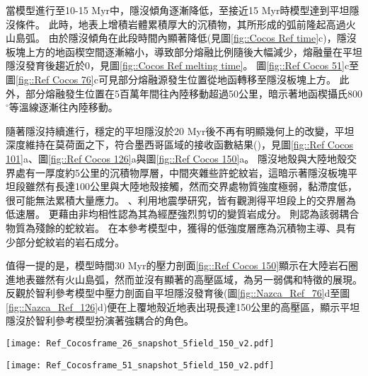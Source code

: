 當模型進行至10-15 Myr中，隱沒傾角逐漸降低，至接近15 Myr時模型達到平坦隱沒條件。
此時，地表上增積岩體累積厚大的沉積物，其所形成的弧前隆起高過火山島弧。
由於隱沒傾角在此段時間內顯著降低(見圖\ref{fig::Cocos Ref time}c)，隱沒板塊上方的地函楔空間逐漸縮小，導致部分熔融比例隨後大幅減少，熔融量在平坦隱沒發育後趨近於0，見圖\ref{fig::Cocos Ref melting time}。
圖\ref{fig::Ref Cocos 51}c至圖\ref{fig::Ref Cocos 76}c可見部分熔融源發生位置從地函轉移至隱沒板塊上方。
此外，部分熔融發生位置在5百萬年間往內陸移動超過50公里，暗示著地函楔攝氏800$^{\circ}$等溫線逐漸往內陸移動。

隨著隱沒持續進行，穩定的平坦隱沒於20 Myr後不再有明顯幾何上的改變，平坦深度維持在莫荷面之下，符合墨西哥區域的接收函數結果(\citealp{PerezCampos2008})，見圖\ref{fig::Ref Cocos 101}a、圖\ref{fig::Ref Cocos 126}a與圖\ref{fig::Ref Cocos 150}a。
隱沒地殼與大陸地殼交界處有一厚度約5公里的沉積物厚層，中間夾雜些許蛇紋岩，這暗示著隱沒板塊平坦段雖然有長達100公里與大陸地殼接觸，然而交界處物質強度極弱，黏滯度低，很可能無法累積大量應力。
\citealp{Song2009}、\citealp{Song2012SC}利用地震學研究，皆有觀測得平坦段上的交界層為低速層。
\citealp{Song2012SC}更藉由非均相性認為其為經歷強烈剪切的變質岩成分。
\citealp{Manea2017}則認為該弱耦合物質為殘餘的蛇紋岩。
在本參考模型中，獲得的低強度層應為沉積物主導、具有少部分蛇紋岩的岩石成分。

值得一提的是，模型時間30 Myr的壓力剖面\ref{fig::Ref Cocos 150}顯示在大陸岩石圈進地表雖然有火山島弧，然而並沒有顯著的高壓區域，為另一弱偶和特徵的展現。
反觀於智利參考模型中壓力剖面自平坦隱沒發育後(圖\ref{fig::Nazca_Ref_76}d至圖\ref{fig::Nazca_Ref_126}d)便在上覆地殼近地表出現長達150公里的高壓區，顯示平坦隱沒於智利參考模型扮演著強耦合的角色。

\begin{figure*}[htp]
    \centering
    \texttt{[image: Ref\_Cocosframe\_26\_snapshot\_5field\_150\_v2.pdf]}
    \caption[墨西哥參考模型於5 Myr時之結果]{墨西哥參考模型於5 Myr時之結果。(a)為岩相剖面，圖中實線為攝氏200-1200度等溫線，粉紅虛線為攝氏1330度等溫線。(b)為黏滯度剖面，(c)為密度剖面，黃點標示部分熔融位置，(d)為動水壓力剖面，(e)為應變率第二不變量。圖(b)-(e)中的灰色實線描繪攝氏400$^{\circ}$、600$^{\circ}$與800$^{\circ}$等溫線。}
    \label{fig::Ref Cocos 26}
\end{figure*}

\begin{figure*}[htp]
    \centering
    \texttt{[image: Ref\_Cocosframe\_51\_snapshot\_5field\_150\_v2.pdf]}
    \caption[墨西哥參考模型於10 Myr時之結果]{墨西哥參考模型於10 Myr時之結果。(a)為岩相剖面，圖中實線為攝氏200-1200度等溫線，粉紅虛線為攝氏1330度等溫線。(b)為黏滯度剖面，(c)為密度剖面，黃點標示部分熔融位置，(d)為動水壓力剖面，(e)為應變率第二不變量。圖(b)-(e)中的灰色實線描繪攝氏400$^{\circ}$、600$^{\circ}$與800$^{\circ}$等溫線。}
    \label{fig::Ref Cocos 51}
\end{figure*}

